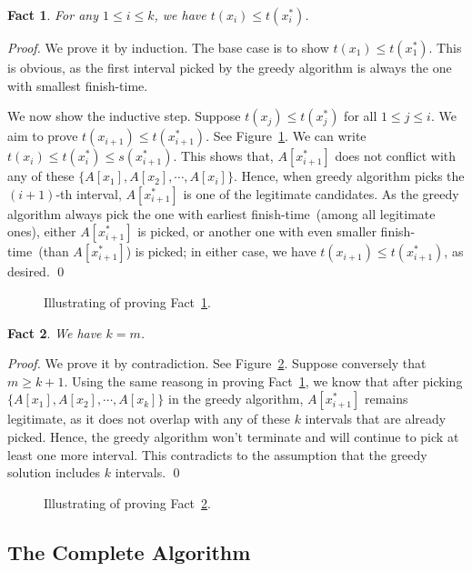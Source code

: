 \documentclass[letterpaper,11pt]{article}
\theoremstyle{mytheorem}
\newtheorem{fact}{Fact}
\begin{document}
\begin{fact} \label{fact1}
For any $1 \le i \le k$, we have $t(x_i) \le t(x_i^*)$.
\end{fact}

\emph{Proof.} We prove it by induction. The base case
is to show $t(x_1) \le t(x_1^*)$. This is obvious,
as the first interval picked by the greedy algorithm 
is always the one with smallest finish-time.

We now show the inductive step. Suppose $t(x_j) \le t(x_j^*)$ for all $1\le j \le i$.
We aim to prove $t(x_{i+1}) \le t(x_{i+1}^*)$. See Figure~\ref{fig:inductive}.
We can write $t(x_i) \le t(x_i^*) \le s(x_{i+1}^*)$. 
This shows that, $A[x^*_{i+1}]$ does not conflict with 
any of these $\{A[x_1], A[x_2], \cdots, A[x_i]\}$.
Hence, when greedy algorithm picks the $(i+1)$-th interval, 
$A[x^*_{i+1}]$ is one of the legitimate candidates.
As the greedy algorithm always pick the one with earliest finish-time~(among all legitimate ones), 
either $A[x^*_{i+1}]$ is picked, or another one with even smaller finish-time~(than $A[x^*_{i+1}]$) is picked;
in either case, we have $t(x_{i+1}) \le t(x_{i+1}^*)$, as desired. \qed

\begin{figure}[h]
\centering{}
\caption{Illustrating of proving Fact~\ref{fact1}.}
\label{fig:inductive}
\end{figure}

\begin{fact} \label{fact2}
We have $k = m$.
\end{fact}

\emph{Proof.} We prove it by contradiction.
See Figure~\ref{fig:fact2}.  Suppose conversely that $m \ge k + 1$.
Using the same reasong in proving Fact~\ref{fact1},
we know that after picking $\{A[x_1], A[x_2], \cdots, A[x_k]\}$ in the greedy algorithm,
$A[x^*_{i+1}]$ remains legitimate, as it does not overlap with any of these $k$ intervals that are already picked.
Hence, the greedy algorithm won't terminate and will continue to pick at least one more interval.
This contradicts to the assumption that the greedy solution includes $k$ intervals. \qed

\begin{figure}[h]
\centering{}
\caption{Illustrating of proving Fact~\ref{fact2}.}
\label{fig:fact2}
\end{figure}


\subsection*{The Complete Algorithm}
\end{document}

